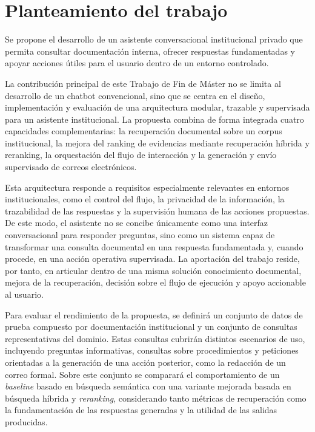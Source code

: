 \section{Planteamiento del trabajo}\label{sec:planteamiento_solucion}

Se propone el desarrollo de un asistente conversacional institucional privado que permita consultar documentación interna, ofrecer respuestas fundamentadas y apoyar acciones útiles para el usuario dentro de un entorno controlado.

La contribución principal de este Trabajo de Fin de Máster no se limita al desarrollo de un chatbot convencional, sino que se centra en el diseño, implementación y evaluación de una arquitectura modular, trazable y supervisada para un asistente institucional. La propuesta combina de forma integrada cuatro capacidades complementarias: la recuperación documental sobre un corpus institucional, la mejora del ranking de evidencias mediante recuperación híbrida y reranking, la orquestación del flujo de interacción y la generación y envío supervisado de correos electrónicos.

Esta arquitectura responde a requisitos especialmente relevantes en entornos institucionales, como el control del flujo, la privacidad de la información, la trazabilidad de las respuestas y la supervisión humana de las acciones propuestas. De este modo, el asistente no se concibe únicamente como una interfaz conversacional para responder preguntas, sino como un sistema capaz de transformar una consulta documental en una respuesta fundamentada y, cuando procede, en una acción operativa supervisada. La aportación del trabajo reside, por tanto, en articular dentro de una misma solución conocimiento documental, mejora de la recuperación, decisión sobre el flujo de ejecución y apoyo accionable al usuario.

Para evaluar el rendimiento de la propuesta, se definirá un conjunto de datos de prueba compuesto por documentación institucional y un conjunto de consultas representativas del dominio. 
Estas consultas cubrirán distintos escenarios de uso, incluyendo preguntas informativas, consultas sobre procedimientos y peticiones orientadas a la generación de una acción posterior, como la redacción de un correo formal. 
Sobre este conjunto se comparará el comportamiento de un \textit{baseline} basado en búsqueda semántica con una variante mejorada basada en búsqueda híbrida y \textit{reranking}, considerando tanto métricas de recuperación como la fundamentación de las respuestas generadas y la utilidad de las salidas producidas.

